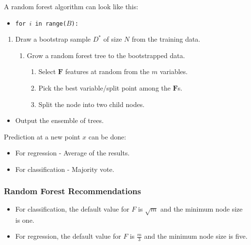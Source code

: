 \bigskip
A random forest algorithm can look like this:
\begin{itemize}
    \item \texttt{for $i$ in range($B$):}
\end{itemize}
\begin{enumerate}
    \item Draw a bootstrap sample $D^{*}$ of size $N$ from the training data.
    \begin{enumerate}
        \item Grow a random forest tree to the bootstrapped data.
        \begin{enumerate}
            \item Select $\bm{F}$ features at random from the $m$ variables.
            \item Pick the best variable/split point among the $\bm{F}$s.
            \item Split the node into two child nodes.
        \end{enumerate}
    \end{enumerate}
\end{enumerate}
\begin{itemize}
    \item Output the ensemble of trees.
\end{itemize}

Prediction at a new point $x$ can be done:
\begin{itemize}
    \item For regression - Average of the results.
    \item For classification - Majority vote.
\end{itemize}

\subsubsection{Random Forest Recommendations}
\begin{itemize}
    \item For classification, the default value for $F$ is $\sqrt{m}$ and the minimum node size is one.
    \item For regression, the default value for $F$ is $\frac{m}{3}$ and the minimum node size is five.
\end{itemize}
